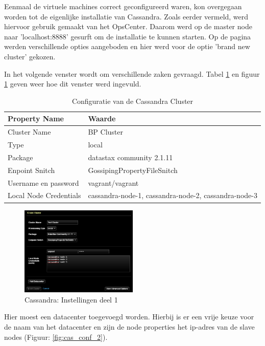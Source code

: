 Eenmaal de virtuele machines correct geconfigureerd waren, kon overgegaan worden tot de eigenlijke installatie van Cassandra.
Zoals eerder vermeld, werd hiervoor gebruik gemaakt van het OpsCenter.
Daarom werd op de master node naar 'localhost:8888' gesurft om de installatie te kunnen  starten.
Op de pagina werden verschillende opties aangeboden en hier werd voor de optie 'brand new cluster' gekozen.

In het volgende venster wordt om verschillende zaken gevraagd.
Tabel \ref{tab:cas_conf} en figuur \ref{fig:cas_conf_1} geven weer hoe dit venster werd ingevuld.

\begin{table}[H]
  \begin{tabular}{|l|l|}
  \hline
  Property Name & Waarde \\
  \hline
  \hline
  Cluster Name & BP Cluster \\
  \hline
  Type & local \\
  \hline
  Package & datastax community 2.1.11 \\
  \hline
  Enpoint Snitch & GossipingPropertyFileSnitch \\
  \hline
  Username en password & vagrant/vagrant\\
  \hline
  Local Node Credentials & cassandra-node-1, cassandra-node-2, cassandra-node-3 \\
  \hline
  \end{tabular}
  \caption{Configuratie van de Cassandra Cluster}
  \label{tab:cas_conf}
\end{table}

\begin{figure}[H]
  	\centering
    \includegraphics[width=0.5\textwidth]{img/4_installatie_cassandra/1_Configuration_part_1}
    \caption{Cassandra: Instellingen deel 1}
    \label{fig:cas_conf_1}
\end{figure}

Hier moest een datacenter toegevoegd worden.
Hierbij is er een vrije keuze voor de naam van het datacenter en zijn de node properties het ip-adres van de slave nodes (Figuur: \ref{fig:cas_conf_2}).

